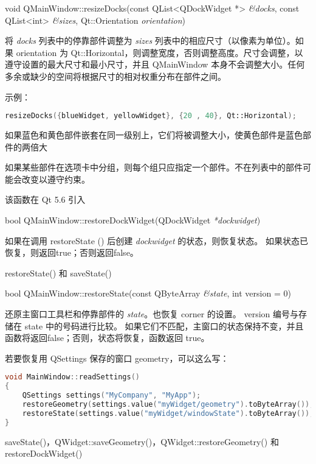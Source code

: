 \splitLine

void QMainWindow::resizeDocks(const QList<QDockWidget *> \emph{\&docks},
 const QList<int> \emph{\&sizes}, Qt::Orientation \emph{orientation})

将 \emph{docks} 列表中的停靠部件调整为 \emph{sizes} 列表中的相应尺寸（以像素为单位）。如果 orientation 为 Qt::Horizontal，则调整宽度，否则调整高度。尺寸会调整，以遵守设置的最大尺寸和最小尺寸，并且 QMainWindow 本身不会调整大小。任何多余或缺少的空间将根据尺寸的相对权重分布在部件之间。

示例：

\begin{lstlisting}[language=C++]
resizeDocks({blueWidget, yellowWidget}, {20 , 40}, Qt::Horizontal);
\end{lstlisting}


如果蓝色和黄色部件嵌套在同一级别上，它们将被调整大小，使黄色部件是蓝色部件的两倍大

如果某些部件在选项卡中分组，则每个组只应指定一个部件。不在列表中的部件可能会改变以遵守约束。

该函数在 Qt 5.6 引入

\splitLine

bool QMainWindow::restoreDockWidget(QDockWidget \emph{*dockwidget})

如果在调用 restoreState () 后创建 \emph{dockwidget} 的状态，则恢复状态。
如果状态已恢复，则返回true；否则返回false。

\begin{seeAlso}
restoreState() 和 saveState()
\end{seeAlso}

\splitLine

bool QMainWindow::restoreState(const QByteArray \emph{\&state}, int version = 0)

还原主窗口工具栏和停靠部件的 \emph{state}。也恢复 corner 的设置。
version 编号与存储在 state 中的号码进行比较。
如果它们不匹配，主窗口的状态保持不变，并且函数将返回false；否则，状态将恢复，函数返回 true。

若要恢复用 QSettings 保存的窗口 geometry，可以这么写：

\begin{lstlisting}[language=C++]
void MainWindow::readSettings()
{
    QSettings settings("MyCompany", "MyApp");
    restoreGeometry(settings.value("myWidget/geometry").toByteArray());
    restoreState(settings.value("myWidget/windowState").toByteArray());
}
\end{lstlisting}

\begin{seeAlso}
saveState()，QWidget::saveGeometry()，QWidget::restoreGeometry() 和 restoreDockWidget()
\end{seeAlso}

